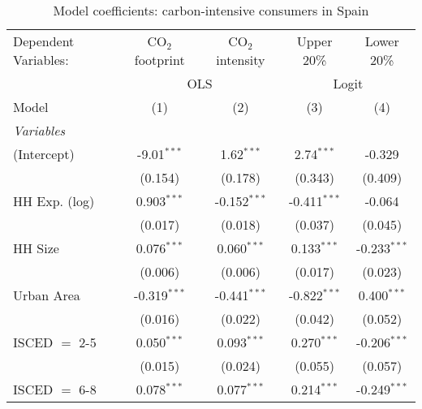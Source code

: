 
\begin{table}[htbp!]
   \centering
   \small
   \begin{adjustbox}{width = 1\textwidth, max height = 0.95\textheight, center}
      \begin{threeparttable}[b]
         \caption{\label{tab:Logit_1_ESP} Model coefficients: carbon-intensive consumers in Spain}
         \begin{tabular}{lcccc}
            \tabularnewline \midrule \midrule
            Dependent Variables: & CO$_{2}$ footprint & CO$_{2}$ intensity & Upper 20\%     & Lower 20\%\\   
             & \multicolumn{2}{c}{OLS} & \multicolumn{2}{c}{Logit} \\ 
            Model                & (1)                & (2)                & (3)            & (4)\\  
            \midrule
            \emph{Variables}\\
            (Intercept)          & -9.01$^{***}$      & 1.62$^{***}$       & 2.74$^{***}$   & -0.329\\   
                                 & (0.154)            & (0.178)            & (0.343)        & (0.409)\\   
            HH Exp. (log)        & 0.903$^{***}$      & -0.152$^{***}$     & -0.411$^{***}$ & -0.064\\   
                                 & (0.017)            & (0.018)            & (0.037)        & (0.045)\\   
            HH Size              & 0.076$^{***}$      & 0.060$^{***}$      & 0.133$^{***}$  & -0.233$^{***}$\\   
                                 & (0.006)            & (0.006)            & (0.017)        & (0.023)\\   
            Urban Area           & -0.319$^{***}$     & -0.441$^{***}$     & -0.822$^{***}$ & 0.400$^{***}$\\   
                                 & (0.016)            & (0.022)            & (0.042)        & (0.052)\\   
            ISCED $=$ 2-5        & 0.050$^{***}$      & 0.093$^{***}$      & 0.270$^{***}$  & -0.206$^{***}$\\   
                                 & (0.015)            & (0.024)            & (0.055)        & (0.057)\\   
            ISCED $=$ 6-8        & 0.078$^{***}$      & 0.077$^{***}$      & 0.214$^{***}$  & -0.249$^{***}$\\   

\end{tabular}
\end{threeparttable}
\end{adjustbox}
\end{table}
